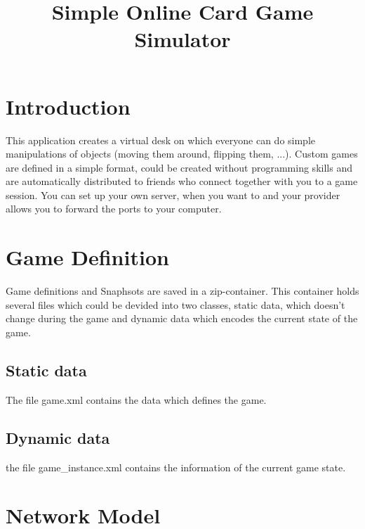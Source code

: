 \documentclass[11pt, a4paper, UKenglish, parskip=half+]{scrbook}
\title{Simple Online Card Game Simulator}
\begin{document}
\maketitle
\chapter{Introduction}
This application creates a virtual desk on which everyone can do simple manipulations of objects (moving them around, flipping them, ...). Custom games are defined in a simple format, could be created without programming skills and are automatically distributed to friends who connect together with you to a game session. You can set up your own server, when you want to and your provider allows you to forward the ports to your computer.
\chapter{Game Definition}
Game definitions and Snaphsots are saved in a zip-container. This container holds several files which could be devided into two classes, static data, which doesn't change during the game and dynamic data which encodes the current state of the game.
\section{Static data}
The file game.xml contains the data which defines the game.
\section{Dynamic data}
the file game\_instance.xml contains the information of the current game state.
\chapter{Network Model}
\end{document}

